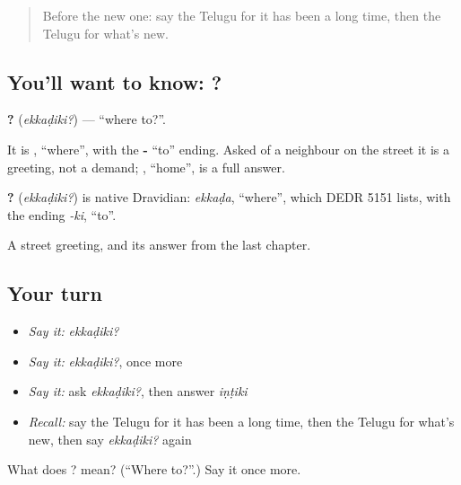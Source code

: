 \label{lesson:TE-C91-whereto}



\begin{quote}
Before the new one: say the Telugu for it has been a long time, then the Telugu for what's new.
\end{quote}

\subsection*{You'll want to know: ?}
\textbf{?} (\emph{ekkaḍiki?}) — \textquotedblleft{}where to?\textquotedblright{}.

It is \textbf{}, \textquotedblleft{}where\textquotedblright{}, with the \textbf{-} \textquotedblleft{}to\textquotedblright{} ending. Asked of a neighbour on the street it is a greeting, not a demand; \emph{}, \textquotedblleft{}home\textquotedblright{}, is a full answer.

\begin{cousinweb}
\textbf{?} (\emph{ekkaḍiki?}) is native Dravidian: \emph{ekkaḍa}, \textquotedblleft{}where\textquotedblright{}, which DEDR 5151 lists, with the ending \emph{-ki}, \textquotedblleft{}to\textquotedblright{}.
\end{cousinweb}

\begin{grammarlens}[title={What you've built}]
A street greeting, and its answer from the last chapter.
\end{grammarlens}

\subsection*{Your turn}
\begin{itemize}
\raggedright
  \item \emph{Say it:} \emph{ekkaḍiki?}
  \item \emph{Say it:} \emph{ekkaḍiki?}, once more
  \item \emph{Say it:} ask \emph{ekkaḍiki?}, then answer \emph{iṇṭiki}
  \item \emph{Recall:} say the Telugu for it has been a long time, then the Telugu for what's new, then say \emph{ekkaḍiki?} again
\end{itemize}

\begin{tcolorbox}[breakable,colback=teal!4,colframe=teal!35!black,title={Before you move on}]
What does ? mean? (\textquotedblleft{}Where to?\textquotedblright{}.) Say it once more.
\end{tcolorbox}
